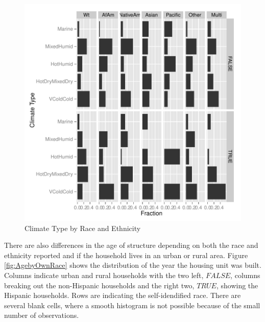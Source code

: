 \documentclass{article}
\begin{document}
\begin{figure}[htbp]
\begin{center}
\caption{Climate Type by Race and Ethnicity}
\label{fig:HeatFuel}
\includegraphics{DraftEdwardsWoods-009}
\end{center}
\end{figure}

There are also differences in the age of structure depending on both the race and ethnicity reported and if the household lives in an urban or rural area.  Figure \ref{fig:AgebyOwnRace} shows the distribution of the year the housing unit was built.  Columns indicate urban and rural households with the two left, $FALSE$, columns breaking out the non-Hispanic households and the right two, $TRUE$, showing the Hispanic households.  Rows are indicating the self-idendified race.  There are several blank cells, where a smooth histogram is not possible because of the small number of observations.
\end{document}
